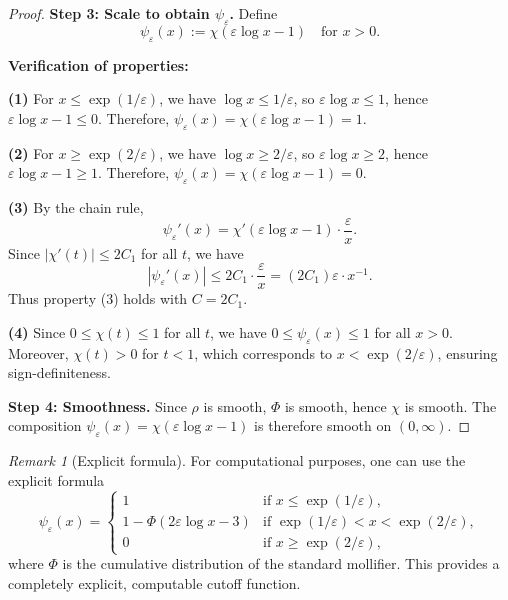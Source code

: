 ﻿\documentclass[12pt,a4paper]{article}
\theoremstyle{definition}
\theoremstyle{remark}
\newtheorem{remark}[theorem]{Remark}
\begin{document}
\begin{proof}
\textbf{Step 3: Scale to obtain $\psi_\varepsilon$.}
Define
\[
  \psi_\varepsilon(x) := \chi\left(\varepsilon \log x - 1\right) \quad \text{for } x > 0.
\]

\textbf{Verification of properties:}

\textbf{(1)} For $x \leq \exp(1/\varepsilon)$, we have $\log x \leq 1/\varepsilon$, so $\varepsilon \log x \leq 1$, hence $\varepsilon \log x - 1 \leq 0$. Therefore, $\psi_\varepsilon(x) = \chi(\varepsilon \log x - 1) = 1$.

\textbf{(2)} For $x \geq \exp(2/\varepsilon)$, we have $\log x \geq 2/\varepsilon$, so $\varepsilon \log x \geq 2$, hence $\varepsilon \log x - 1 \geq 1$. Therefore, $\psi_\varepsilon(x) = \chi(\varepsilon \log x - 1) = 0$.

\textbf{(3)} By the chain rule,
\[
  \psi_\varepsilon'(x) = \chi'(\varepsilon \log x - 1) \cdot \frac{\varepsilon}{x}.
\]
Since $|\chi'(t)| \leq 2C_1$ for all $t$, we have
\[
  |\psi_\varepsilon'(x)| \leq 2C_1 \cdot \frac{\varepsilon}{x} = (2C_1) \varepsilon \cdot x^{-1}.
\]
Thus property (3) holds with $C = 2C_1$.

\textbf{(4)} Since $0 \leq \chi(t) \leq 1$ for all $t$, we have $0 \leq \psi_\varepsilon(x) \leq 1$ for all $x > 0$. Moreover, $\chi(t) > 0$ for $t < 1$, which corresponds to $x < \exp(2/\varepsilon)$, ensuring sign-definiteness.

\textbf{Step 4: Smoothness.}
Since $\rho$ is smooth, $\Phi$ is smooth, hence $\chi$ is smooth. The composition $\psi_\varepsilon(x) = \chi(\varepsilon \log x - 1)$ is therefore smooth on $(0, \infty)$.
\end{proof}

\begin{remark}[Explicit formula]
For computational purposes, one can use the explicit formula
\[
  \psi_\varepsilon(x) = \begin{cases}
    1 & \text{if } x \leq \exp(1/\varepsilon), \\
    1 - \Phi(2\varepsilon \log x - 3) & \text{if } \exp(1/\varepsilon) < x < \exp(2/\varepsilon), \\
    0 & \text{if } x \geq \exp(2/\varepsilon),
  \end{cases}
\]
where $\Phi$ is the cumulative distribution of the standard mollifier. This provides a completely explicit, computable cutoff function.
\end{remark}
\end{document}
